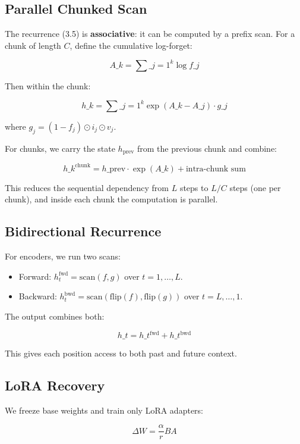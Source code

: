 \subsection{Parallel Chunked Scan}

The recurrence (3.5) is \textbf{associative}: it can be computed by a prefix scan. 
For a chunk of length $C$, define the cumulative log-forget:

\[
A\_k = \sum\_{j=1}^{k} \log f\_j
\tag{3.6}
\]

Then within the chunk:

\[
h\_k = \sum\_{j=1}^{k} \exp(A\_k - A\_j) \cdot g\_j
\tag{3.7}
\]

where $g_j = (1 - f_j) \odot i_j \odot v_j$.

For chunks, we carry the state $h_\text{prev}$ from the previous chunk and 
combine:

\[
h\_k^\text{chunk} = h\_\text{prev} \cdot \exp(A\_k) + \text{intra-chunk sum}
\tag{3.8}
\]

This reduces the sequential dependency from $L$ steps to $L / C$ steps 
(one per chunk), and inside each chunk the computation is parallel.

\subsection{Bidirectional Recurrence}

For encoders, we run two scans:

\begin{itemize}
\item Forward: $h_t^\text{fwd} = \text{scan}(f, g)$ over $t = 1, \ldots, L$.
\item Backward: $h_t^\text{bwd} = \text{scan}(\text{flip}(f), \text{flip}(g))$ over
  $t = L, \ldots, 1$.

\end{itemize}
The output combines both:

\[
h\_t = h\_t^\text{fwd} + h\_t^\text{bwd}
\tag{3.9}
\]

This gives each position access to both past and future context.

\subsection{LoRA Recovery}

We freeze base weights and train only LoRA adapters:

\[
\Delta W = \frac{\alpha}{r} B A
\tag{3.10}
\]

